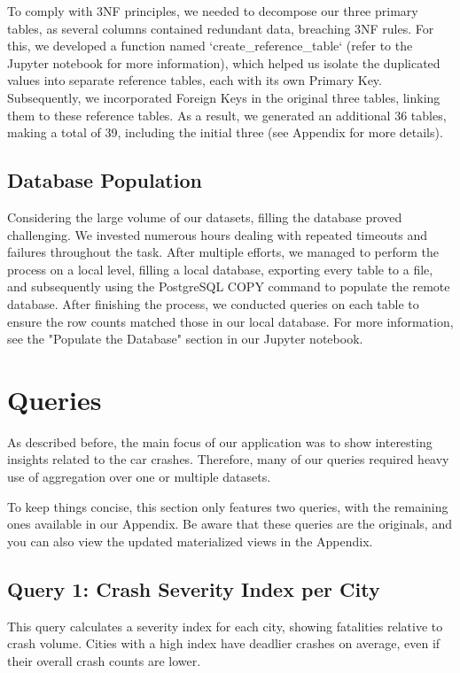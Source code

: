 \documentclass[12pt]{article}
\begin{document}
To comply with 3NF principles, we needed to decompose our three primary tables, as several columns contained redundant data, breaching 3NF rules. For this, we developed a function named `create\_reference\_table` (refer to the Jupyter notebook for more information), which helped us isolate the duplicated values into separate reference tables, each with its own Primary Key. Subsequently, we incorporated Foreign Keys in the original three tables, linking them to these reference tables. As a result, we generated an additional 36 tables, making a total of 39, including the initial three (see Appendix for more details).


\subsection{Database Population}

Considering the large volume of our datasets, filling the database proved challenging. We invested numerous hours dealing with repeated timeouts and failures throughout the task. After multiple efforts, we managed to perform the process on a local level, filling a local database, exporting every table to a file, and subsequently using the PostgreSQL COPY command to populate the remote database. After finishing the process, we conducted queries on each table to ensure the row counts matched those in our local database. For more information, see the "Populate the Database" section in our Jupyter notebook.

\section{Queries}

As described before, the main focus of our application was to show interesting insights related to the car crashes. Therefore, many of our queries required heavy use of aggregation over one or multiple datasets. 

To keep things concise, this section only features two queries, with the remaining ones available in our Appendix. Be aware that these queries are the originals, and you can also view the updated materialized views in the Appendix.

\subsection{Query 1: Crash Severity Index per City}

This query calculates a severity index for each city, showing fatalities relative to crash volume. Cities with a high index have deadlier crashes on average, even if their overall crash counts are lower.
\end{document}
